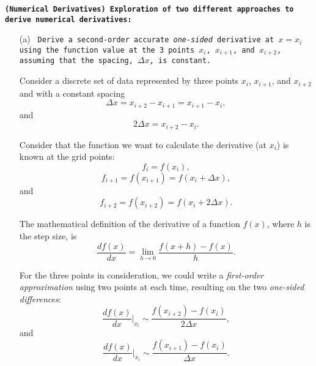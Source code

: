 \documentclass[11pt]{article}
\author{\color{purple}{\bf MIA STEIN}}
\title{\color{red}{\bf PHYS 688: Numerical Methods for AstroPhysics \\Homework \#1: Integration \&  Differentiation} }
\newcounter{question}[section]
\newcommand{\question}[2] {\vspace{.25in} \fbox{#1} #2 \vspace{.10in}}
\begin{document}
\maketitle



{\color{MidnightBlue}
\question{Q.1}{\texttt{{\bf(Numerical Derivatives)} {\bf Exploration of two different approaches to derive numerical derivatives:	
}}}}

\quad

\begin{enumerate}

\item[(a)] {\color{MidnightBlue} \texttt{ Derive a second-order accurate {\it one-sided} derivative at $x=x_i$ using	the function value at the 3 points $x_i$, $x_{i+1}$, and $x_{i+2}$, assuming that the spacing, $\Delta x$, is constant.}}

\quad

Consider a discrete set of data represented by three points $x_i$, $x_{i+1}$, and $x_{i+2}$ and with a constant spacing 
$$\Delta x = x_{i+2}-x_{i+1}=x_{i+1}-x_i,$$
and
$$2\Delta x = x_{i+2}-x_{i}.$$

\quad

Consider that the function we want to calculate the derivative (at $x_i$) is known at the grid points:
$$f_i=f(x_i),$$   
$$f_{i+1}=f(x_{i+1})=f(x_i + \Delta x),$$
and 
$$f_{i+2}=f(x_{i+2})= f(x_i + 2 \Delta x).$$ 

\quad

The mathematical definition of the derivative of a function $f(x)$, where $h$ is the step size, is
\begin{equation}
\frac{df(x)}{dx} = \lim_{h \rightarrow 0} \frac{f(x+h)-f(x)}{h }.
\label{f'}
\end{equation}

\quad

For the three points in consideration, we could write a {\it first-order approximation} using two points at each time, resulting on the two {\it one-sided differences}:
$$\frac{df(x)}{dx}\Bigg|_{x_{i}} \sim \frac{f(x_{i+2}) - f(x_{i})}{2 \Delta x},$$
and
$$\frac{df(x)}{dx}\Bigg|_{x_{i}} \sim \frac{f(x_{i+1}) - f(x_{i})}{\Delta x}.$$

\quad


\end{enumerate}
\end{document}
